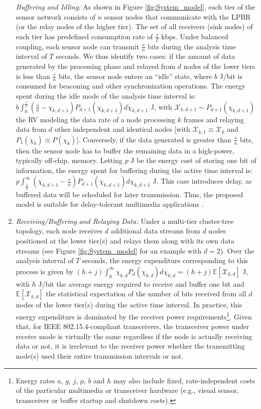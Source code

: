 \documentclass[twocolumn,english]{IEEEtran}
\theoremstyle{plain}
\theoremstyle{definition}
\begin{document}
\begin{enumerate}[leftmargin=*]
\textit{Buffering and Idling:} As shown in Figure \ref{fig:System_model},
each tier of the sensor network consists of $n$ sensor nodes that
communicate with the LPBR (or the relay nodes of the higher tier).
The set of all receivers (sink nodes) of each tier has predefined
consumption rate of $\frac{s}{T}$ kbps. Under balanced coupling,
each sensor node can transmit $\frac{s}{n}$ bits during the analysis
time interval of $T$ seconds. We thus identify two cases: if the
amount of data generated by the processing phase and relayed from
$d$ nodes of the lower tiers is less than $\frac{s}{n}$ bits, the
sensor node enters an ``idle'' state, where $b$ J/bit is consumed
for beaconing and other synchronization operations. The energy spent
during the idle mode of the analysis time interval is: $b\int_{0}^{\frac{s}{n}}(\frac{s}{n}-\chi_{k,d+1})P_{d+1}(\chi_{k,d+1})d\chi_{k,d+1}$
J, with $\mathcal{X}_{k,d+1}\sim P_{d+1}(\chi_{k,d+1})$ the RV modeling
the data rate of a node processing $k$ frames and relaying data from
$d$ other independent and identical nodes {[}with $\mathcal{X}_{k,1}\equiv\mathcal{X}_{k}$
and $P_{1}(\chi_{k})\equiv P(\chi_{k})${]}. Conversely, if the data
generated is greater than $\frac{s}{n}$ bits, then the sensor node
has to buffer the remaining data in a high-power, typically off-chip,
memory. Letting $p$ J be the energy cost of storing one bit of information,
the energy spent for buffering during the active time interval is:
$p\int_{\frac{s}{n}}^{\infty}(\chi_{k,d+1}-\frac{s}{n})P_{d+1}(\chi_{k,d+1})d\chi_{k,d+1}$
J. This case introduces delay, as buffered data will be scheduled
for later transmission. Thus, the proposed model is suitable for delay-tolerant
multimedia applications \cite{citeulike:3839709}.

\item

\emph{Receiving/Buffering and Relaying Data:} Under a multi-tier cluster-tree
topology, each node receives $d$ additional data streams from $d$
nodes positioned at the lower tier(s) and relays them along with its
own data streams (see Figure \ref{fig:System_model} for an example
with $d=2$). Over the analysis interval of $T$ seconds, the energy
expenditure corresponding to this process is given by $\left(h+j\right)\int_{0}^{\infty}\chi_{k,d}P_{d}\left(\chi_{k,d}\right)d\chi_{k,d}=\left(h+j\right)\mathbb{E}\left[\mathcal{X}_{k,d}\right]$
J, with $h$ J/bit the average energy required to receive and buffer
one bit and $\mathbb{E}\left[\mathcal{X}_{k,d}\right]$ the statistical
expectation of the number of bits received from all $d$ nodes of
the lower tier(s) during the active time interval. In practice, this
energy expenditure is dominated by the receiver power requirements\footnote{Energy rates $a$, $g$, $j$, $p$, $b$ and $h$ may also include
fixed, rate-independent costs of the particular multimedia or transceiver
hardware (e.g., visual sensor, transceiver or buffer startup and shutdown
costs).}. Given that, for IEEE 802.15.4-compliant transceivers, the transceiver
power under receive mode is virtually the same regardless if the node
is actually receiving data or not, it is irrelevant to the receiver
power whether the transmitting node(s) used their entire transmission
intervals or not.


\end{enumerate}
\end{document}
